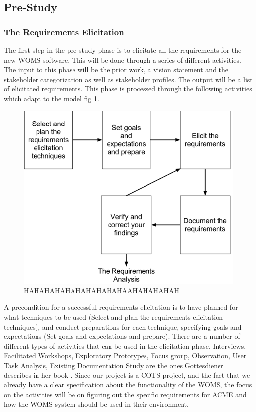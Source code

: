\documentclass[a4paper]{article}
\begin{document}
\subsection{Pre-Study}
\label{sub:pre_study}

\subsubsection{The Requirements Elicitation}
\label{subsub:the_requirements_elicitation}

The first step in the pre-study phase is to elicitate all the requirements for the new WOMS software. This will be done through a series of different activities. The input to this phase will be the prior work, a vision statement and the stakeholder categorization as well as stakeholder profiles. The output will be a list of elicitated requirements. This phase is processed through the following activities which adapt to the model fig \ref{figure:elicitation}. 

\begin{figure}[!ht]
	\includegraphics[width=1\textwidth]{images/elicitation_model.png}
	\caption{HAHAHAHAHAHAHAHAHAHAAHAHAHAHAH}
	\label{figure:elicitation}
\end{figure}


A precondition for a successful requirements elicitation is to have planned for what techniques to be used (Select and plan the requirements elicitation techniques), and conduct preparations for each technique, specifying goals and expectations (Set goals and expectations and prepare). There are a number of different types of activities that can be used in the elicitation phase, Interviews, Facilitated Workshops, Exploratory Prototypes, Focus group, Observation, User Task Analysis, Existing Documentation Study are the ones Gottesdiener describes in her book \cite{gott64}. Since our project is a COTS project, and the fact that we already have a clear specification about the functionality of the WOMS, the focus on the activities will be on figuring out the specific requirements for ACME and how the WOMS system should be used in their environment.
\end{document}
